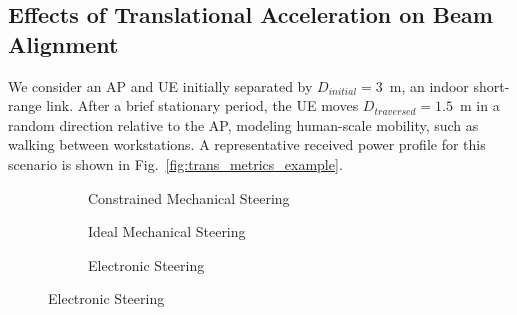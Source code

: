 \documentclass[fleqn,10pt]{wlscirep}
\begin{document}
\subsection*{Effects of Translational Acceleration on Beam Alignment}

We consider an AP and UE initially separated by $D_{initial} = 3$~m, an indoor short-range link\cite{9013236}. After a brief stationary period, the UE moves $D_{traversed} = 1.5$~m in a random direction relative to the AP, modeling human-scale mobility, such as walking between workstations. A representative received power profile for this scenario is shown in Fig.~\ref{fig:trans_metrics_example}.

\begin{figure}[ht!]
    \centering
        \begin{subfigure}{0.3275\linewidth}
        
        \vspace{-25pt}
        \caption{Constrained Mechanical Steering}
        \label{fig:trans_exp_rate}
    \end{subfigure}
    \hfill
    \begin{subfigure}{0.3275\linewidth}
    
        \vspace{-25pt}
        \caption{Ideal Mechanical Steering}
        \label{fig:trans_sim_rate}
    \end{subfigure}
    \hfill
    \begin{subfigure}{0.3275\linewidth}
        
        \vspace{-25pt}
        \caption{Electronic Steering}
        \label{fig:trans_simfast_rate}
    \end{subfigure}

    \vspace{8 pt}

\end{figure}
\end{document}
